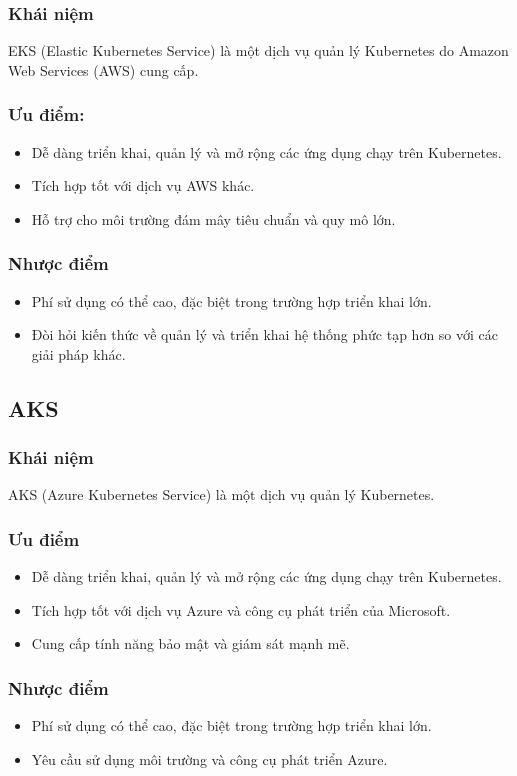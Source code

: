 \subsubsection{Khái niệm}
\indent EKS (Elastic Kubernetes Service) là một dịch vụ quản lý Kubernetes do Amazon Web Services (AWS) cung cấp.
\subsubsection{Ưu điểm:}
\begin{itemize}
    \item Dễ dàng triển khai, quản lý và mở rộng các ứng dụng chạy trên Kubernetes.
    \item Tích hợp tốt với dịch vụ AWS khác.
    \item Hỗ trợ cho môi trường đám mây tiêu chuẩn và quy mô lớn.
\end{itemize}
\subsubsection{Nhược điểm}
\begin{itemize}
    \item Phí sử dụng có thể cao, đặc biệt trong trường hợp triển khai lớn.
    \item Đòi hỏi kiến thức về quản lý và triển khai hệ thống phức tạp hơn so với các giải pháp khác.
\end{itemize}
\subsection{AKS}
\subsubsection{Khái niệm}
\indent AKS (Azure Kubernetes Service) là một dịch vụ quản lý Kubernetes.

\subsubsection{Ưu điểm}
\begin{itemize}
    \item Dễ dàng triển khai, quản lý và mở rộng các ứng dụng chạy trên Kubernetes.
    \item Tích hợp tốt với dịch vụ Azure và công cụ phát triển của Microsoft.
    \item Cung cấp tính năng bảo mật và giám sát mạnh mẽ.
\end{itemize}
\subsubsection{Nhược điểm}
\begin{itemize}
    \item Phí sử dụng có thể cao, đặc biệt trong trường hợp triển khai lớn.
    \item Yêu cầu sử dụng môi trường và công cụ phát triển Azure.
\end{itemize}
